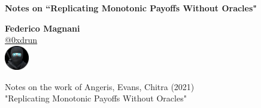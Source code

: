 \documentclass[12pt]{article}
\begin{document}
\theoremstyle{definition}
\newtheorem{definition}{Definition}[section]

\begin{titlepage}
    \begin{center}
        \vspace*{1cm}

        \Huge
        \textbf{Notes on ``Replicating Monotonic Payoffs Without Oracles"}

        \vspace{0.5cm}
        \LARGE


        \vspace{1.5cm}

        \textbf{Federico Magnani} \\
        \medskip
        \href{https://twitter.com/0xdrun}{@0xdrun}
        \vspace{0.5cm}
        \\
        \href{https://twitter.com/0xdrun}{\includegraphics[width=0.08\textwidth]{./images/0xdrun.jpeg}}
        \Large

        \vfill

        Notes on the work of Angeris, Evans, Chitra (2021)
        \\"Replicating Monotonic Payoffs Without Oracles"

        \vspace{0.8cm}


    \end{center}
\end{titlepage}
\Large
\end{document}
